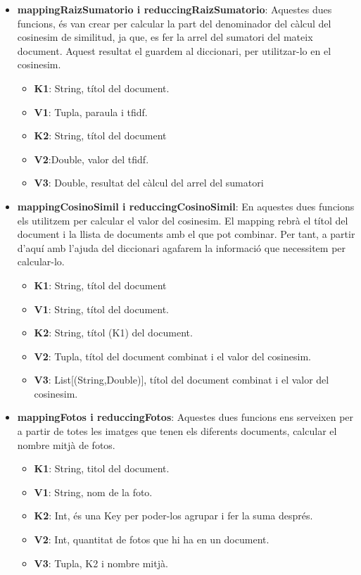 \documentclass[11pt,a4paper]{article}
\begin{document}
\begin{itemize}
\begin{itemize}
			\item \textbf{mappingRaizSumatorio i reduccingRaizSumatorio}:
Aquestes dues funcions, és van crear per calcular la part del denominador del càlcul del cosinesim de similitud, ja que, es fer la arrel del sumatori del mateix document. Aquest resultat el guardem al diccionari, per utilitzar-lo en el cosinesim.
			\begin{itemize}
				\item \textbf{K1}:  String, títol del document.
				\item \textbf{V1}: Tupla, paraula i tfidf.
				\item \textbf{K2}: String, títol del document
				\item \textbf{V2}:Double, valor del tfidf.
				\item \textbf{V3}: Double, resultat del càlcul del arrel del sumatori
			\end{itemize}
			
			\item \textbf{mappingCosinoSimil i reduccingCosinoSimil}:
En aquestes dues funcions els utilitzem per calcular el valor del cosinesim. El mapping rebrà el títol del document i la llista de documents amb el que pot combinar. Per tant, a partir d’aquí amb l’ajuda del diccionari agafarem la informació que necessitem per calcular-lo. 
			\begin{itemize}
				\item \textbf{K1}: String, títol del document
				\item \textbf{V1}: String, títol del document.
				\item \textbf{K2}: String, títol (K1) del document.
				\item \textbf{V2}: Tupla, títol del document combinat i el valor del cosinesim.
				\item \textbf{V3}: List[(String,Double)], títol del document combinat i el valor del cosinesim.
			\end{itemize}		
			
			\item \textbf{mappingFotos i reduccingFotos}:
			Aquestes dues funcions ens serveixen per a partir de totes les imatges que tenen els diferents documents, calcular el nombre mitjà de fotos.
			\begin{itemize}
				\item \textbf{K1}: String, titol del document.
				\item \textbf{V1}: String, nom de la foto.
				\item \textbf{K2}: Int, és una Key per poder-los agrupar i fer la suma després.
				\item \textbf{V2}: Int, quantitat de fotos que hi ha en un document.
				\item \textbf{V3}: Tupla, K2 i nombre mitjà.
			\end{itemize}
			

\end{itemize}
\end{itemize}
\end{document}
